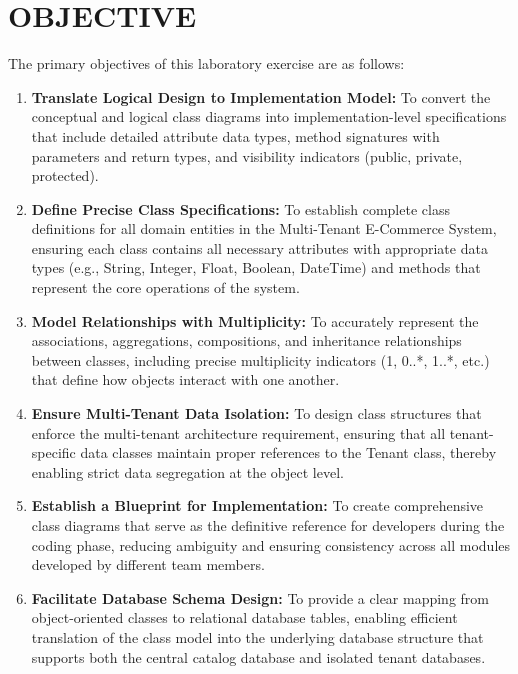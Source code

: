 \chapter{OBJECTIVE}\label{obj}

The primary objectives of this laboratory exercise are as follows:

\begin{enumerate}
    \item \textbf{Translate Logical Design to Implementation Model:} To convert the conceptual and logical class diagrams into implementation-level specifications that include detailed attribute data types, method signatures with parameters and return types, and visibility indicators (public, private, protected).
    
    \item \textbf{Define Precise Class Specifications:} To establish complete class definitions for all domain entities in the Multi-Tenant E-Commerce System, ensuring each class contains all necessary attributes with appropriate data types (e.g., String, Integer, Float, Boolean, DateTime) and methods that represent the core operations of the system.
    
    \item \textbf{Model Relationships with Multiplicity:} To accurately represent the associations, aggregations, compositions, and inheritance relationships between classes, including precise multiplicity indicators (1, 0..*, 1..*, etc.) that define how objects interact with one another.
    
    \item \textbf{Ensure Multi-Tenant Data Isolation:} To design class structures that enforce the multi-tenant architecture requirement, ensuring that all tenant-specific data classes maintain proper references to the Tenant class, thereby enabling strict data segregation at the object level.
    
    \item \textbf{Establish a Blueprint for Implementation:} To create comprehensive class diagrams that serve as the definitive reference for developers during the coding phase, reducing ambiguity and ensuring consistency across all modules developed by different team members.
    
    \item \textbf{Facilitate Database Schema Design:} To provide a clear mapping from object-oriented classes to relational database tables, enabling efficient translation of the class model into the underlying database structure that supports both the central catalog database and isolated tenant databases.
\end{enumerate}
\clearpage
















